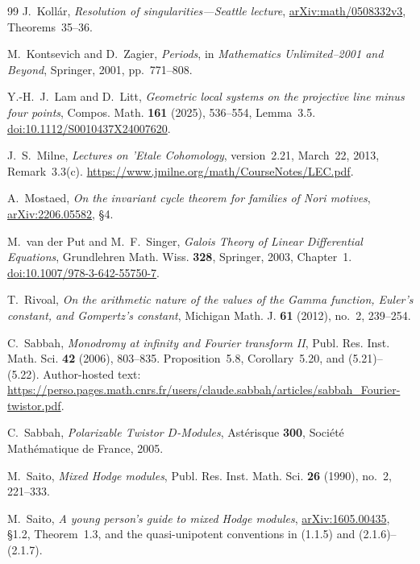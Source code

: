 \documentclass[11pt]{article}
\numberwithin{equation}{section}
\theoremstyle{definition}
\theoremstyle{remark}
\begin{document}
\begin{thebibliography}{99}
J.~Koll\'ar, \emph{Resolution of singularities---Seattle lecture},
\href{https://arxiv.org/abs/math/0508332v3}{arXiv:math/0508332v3},
Theorems~35--36.

M.~Kontsevich and D.~Zagier,
\emph{Periods},
in \emph{Mathematics Unlimited--2001 and Beyond}, Springer, 2001, pp.~771--808.

Y.-H.~J.~Lam and D.~Litt, \emph{Geometric local systems on the projective
line minus four points}, Compos. Math. \textbf{161} (2025), 536--554,
Lemma~3.5. \href{https://doi.org/10.1112/S0010437X24007620}{doi:10.1112/S0010437X24007620}.

J.~S.~Milne, \emph{Lectures on 'Etale Cohomology}, version~2.21,
March~22, 2013, Remark~3.3(c).
\url{https://www.jmilne.org/math/CourseNotes/LEC.pdf}.

A.~Mostaed, \emph{On the invariant cycle theorem for families of Nori
motives}, \href{https://arxiv.org/abs/2206.05582}{arXiv:2206.05582}, \S4.

M.~van der Put and M.~F.~Singer, \emph{Galois Theory of Linear Differential
Equations}, Grundlehren Math. Wiss. \textbf{328}, Springer, 2003, Chapter~1.
\href{https://doi.org/10.1007/978-3-642-55750-7}{doi:10.1007/978-3-642-55750-7}.

T.~Rivoal,
\emph{On the arithmetic nature of the values of the Gamma function, Euler's constant, and Gompertz's constant},
Michigan Math. J. \textbf{61} (2012), no.~2, 239--254.

C.~Sabbah, \emph{Monodromy at infinity and Fourier transform II},
Publ. Res. Inst. Math. Sci. \textbf{42} (2006), 803--835.
Proposition~5.8, Corollary~5.20, and (5.21)--(5.22). Author-hosted text:
\url{https://perso.pages.math.cnrs.fr/users/claude.sabbah/articles/sabbah_Fourier-twistor.pdf}.

C.~Sabbah,
\emph{Polarizable Twistor $D$-Modules},
Ast\'erisque \textbf{300}, Soci\'et\'e Math\'ematique de France, 2005.

M.~Saito,
\emph{Mixed Hodge modules},
Publ. Res. Inst. Math. Sci. \textbf{26} (1990), no.~2, 221--333.

M.~Saito, \emph{A young person's guide to mixed Hodge modules},
\href{https://arxiv.org/abs/1605.00435}{arXiv:1605.00435},
\S1.2, Theorem~1.3, and the quasi-unipotent conventions in
(1.1.5) and (2.1.6)--(2.1.7).


\end{thebibliography}
\end{document}
